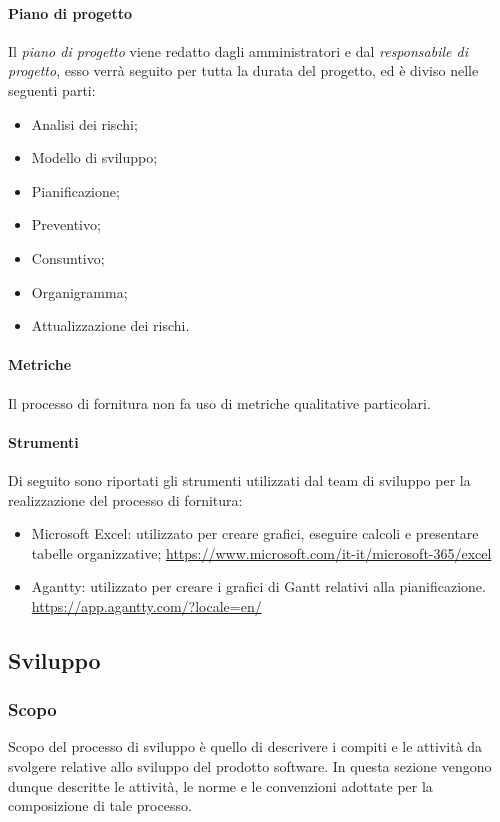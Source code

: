 \paragraph{Piano di progetto}\label{paragraph: PdP_fornitura}
Il \textit{piano di progetto} viene redatto dagli amministratori e dal \textit{responsabile di progetto}, esso verrà seguito per tutta la durata del progetto, ed è diviso nelle seguenti parti:
\begin{itemize}
    \item Analisi dei rischi;
    \item Modello di sviluppo;
    \item Pianificazione;
    \item Preventivo;
    \item Consuntivo;
    \item Organigramma;
    \item Attualizzazione dei rischi.
\end{itemize} 
\paragraph{Metriche}\label{paragraph: metriche_fornitura}
Il processo di fornitura non fa uso di metriche qualitative particolari.
\paragraph{Strumenti}\label{paragraph: strumenti_fornitura}
Di seguito sono riportati gli strumenti utilizzati dal team di sviluppo per la realizzazione del processo di fornitura:
\begin{itemize}
    \item Microsoft Excel: utilizzato per creare grafici, eseguire calcoli e presentare tabelle organizzative; 
    \url{https://www.microsoft.com/it-it/microsoft-365/excel}
    \item Agantty: utilizzato per creare i grafici di Gantt relativi alla pianificazione. 
    \url{https://app.agantty.com/?locale=en/}
\end{itemize}

\pagebreak

\subsection{Sviluppo} \label{subsection:Sviluppo}
    \subsubsection{Scopo} \label{subsubsection:Sviluppo_Scopo}
    Scopo del processo di sviluppo è quello di descrivere i compiti e le attività da svolgere relative allo sviluppo del prodotto software.
    In questa sezione vengono dunque descritte le attività, le norme e le convenzioni adottate per la composizione di tale processo.

